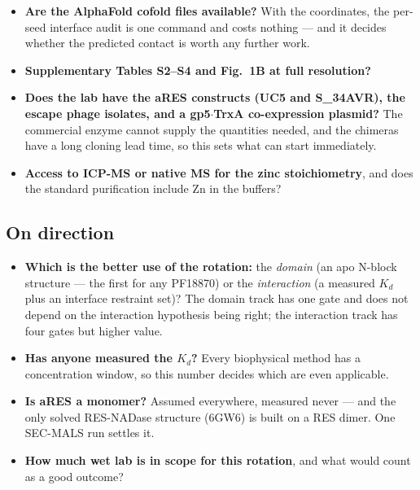 \documentclass[11pt,a4paper]{article}
\begin{document}
\begin{itemize}[leftmargin=1.4em,itemsep=2pt,label=$\square$]
  \item \textbf{Are the AlphaFold cofold files available?} With the coordinates, the per-seed
        interface audit is one command and costs nothing --- and it decides whether the predicted
        contact is worth any further work.
  \item \textbf{Supplementary Tables S2--S4 and Fig.~1B at full resolution?}
  \item \textbf{Does the lab have the aRES constructs (UC5 and S\_34AVR), the escape phage isolates,
        and a gp5$\cdot$TrxA co-expression plasmid?} The commercial enzyme cannot supply the
        quantities needed, and the chimeras have a long cloning lead time, so this sets what can
        start immediately.
  \item \textbf{Access to ICP-MS or native MS for the zinc stoichiometry}, and does the standard
        purification include Zn in the buffers?
\end{itemize}

\subsection*{On direction}

\begin{itemize}[leftmargin=1.4em,itemsep=2pt,label=$\square$]
  \item \textbf{Which is the better use of the rotation:} the \emph{domain} (an apo N-block
        structure --- the first for any PF18870) or the \emph{interaction} (a measured $K_d$ plus an
        interface restraint set)? The domain track has one gate and does not depend on the
        interaction hypothesis being right; the interaction track has four gates but higher value.
  \item \textbf{Has anyone measured the $K_d$?} Every biophysical method has a concentration window,
        so this number decides which are even applicable.
  \item \textbf{Is aRES a monomer?} Assumed everywhere, measured never --- and the only solved
        RES-NADase structure (6GW6) is built on a RES dimer. One SEC-MALS run settles it.
  \item \textbf{How much wet lab is in scope for this rotation}, and what would count as a good
        outcome?
\end{itemize}
\end{document}
